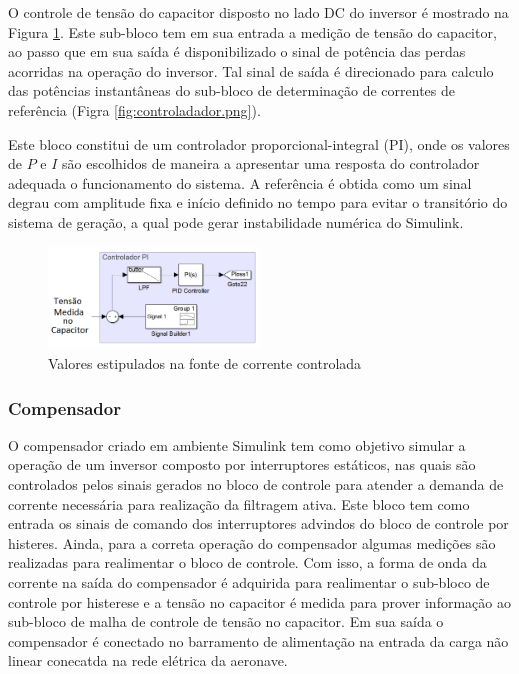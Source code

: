 O controle de tensão do capacitor disposto no lado DC do inversor é mostrado na Figura \ref{fig:PI_sim.png}. Este sub-bloco tem em sua entrada a medição de tensão do capacitor, ao passo que em sua saída é disponibilizado o sinal de potência das perdas acorridas na operação do inversor. Tal sinal de saída é direcionado para calculo das potências instantâneas do sub-bloco de determinação de correntes de referência (Figra \ref{fig:controladador.png}).

Este bloco constitui de um controlador proporcional-integral (PI), onde os valores de $P$ e $I$ são escolhidos de maneira a apresentar uma resposta do controlador adequada o funcionamento do sistema. A referência é obtida como um sinal degrau com amplitude fixa e início definido no tempo para evitar o transitório do sistema de geração, a qual pode gerar instabilidade numérica do Simulink. 

\begin{figure}[!htb] %
	\centering
	\includegraphics[width=0.5\textwidth]{Cap4/Figuras/PI_sim.png}
	\caption{Valores estipulados na fonte de corrente controlada}
	\label{fig:PI_sim.png}
\end{figure}

\subsubsection{Compensador}

O compensador criado em ambiente Simulink tem como objetivo simular a operação de um inversor composto por interruptores estáticos, nas quais são controlados pelos sinais gerados no bloco de controle para atender a demanda de corrente necessária para realização da filtragem ativa. Este bloco tem como entrada os sinais de comando dos interruptores advindos do bloco de controle por histeres. Ainda, para a correta operação do compensador algumas medições são realizadas para realimentar o bloco de controle. Com isso, a forma de onda da corrente na saída do compensador é adquirida para realimentar o sub-bloco de controle por histerese e a tensão no capacitor é medida para prover informação ao sub-bloco de malha de controle de tensão no capacitor. Em sua saída o compensador é conectado no barramento de alimentação na entrada da carga não linear conecatda na rede elétrica da aeronave.

